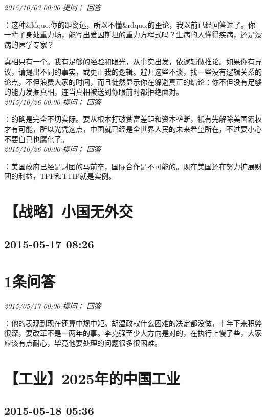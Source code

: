 \documentclass[twocolumn]{ctexart}
\begin{document}
\textit{\hfill\noindent\small 2015/10/03 00:00 提问； 回答}

：这种\&ldquo;你的距离远，所以不懂\&rdquo;的歪论，我以前已经回答过了。你一辈子身处重力场，能写出爱因斯坦的重力方程式吗？生病的人懂得疾病，还是没病的医学专家？

真相只有一个。我有足够的经验和眼光，从事实出发，依逻辑做推论。如果你有异议，请提出不同的事实，或更正我的逻辑。避开这些不谈，找一些没有逻辑关系的论点，不但浪费大家的时间，而且徒然显示你在躲避真正的结论：你不但没有足够的能力发掘真相，连当真相被送到你眼前时都拒绝面对。\\

\textit{\hfill\noindent\small 2015/10/26 00:00 提问； 回答}

：的确是完全不切实际。要从根本打破贫富差距和资本垄断，衹有先解除美国霸权才有可能，所以光凭这点，中国就已经是全世界人民的未来希望所在，不过要小心不要自己也腐化了。\\

\textit{\hfill\noindent\small 2015/10/26 00:00 提问； 回答}

：美国政府已经是财团的马前卒，国际合作是不可能的。现在美国还在努力扩展财团的利益，TPP和TTIP就是实例。\\


\section{【战略】小国无外交}
\subsection{2015-05-17 08:26}


\section{1条问答}

\textit{\hfill\noindent\small 2015/05/17 00:00 提问； 回答}

：他的表现到现在还算中规中矩。胡温政权什么困难的决定都没做，十年下来积弊很深，要改革不是一两年的事。李克强至少大方向是对的，在执行上慢了些，大家应该有点耐心，毕竟他要处理的问题很多很困难。\\


\section{【工业】2025年的中国工业}
\subsection{2015-05-18 05:36}
\end{document}
